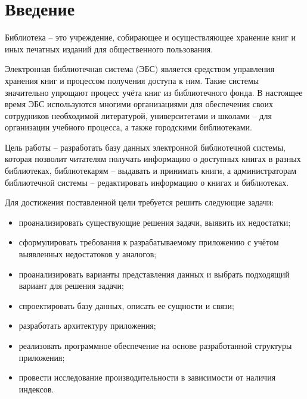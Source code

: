 \chapter*{Введение}

Библиотека -- это учреждение, собирающее и осуществляющее хранение книг и иных печатных изданий для общественного пользования. 


Электронная библиотечная система (ЭБС) является средством управления хранения книг и процессом получения доступа к ним. Такие системы значительно упрощают процесс учёта книг из библиотечного фонда. В настоящее время ЭБС используются многими организациями для обеспечения своих сотрудников необходимой литературой, университетами и школами -- для организации учебного процесса, а также городскими библиотеками. 

Цель работы -- разработать базу данных электронной библиотечной системы, которая позволит читателям получать информацию о доступных книгах в разных библиотеках, библиотекарям -- выдавать и принимать книги, а администраторам библиотечной системы -- редактировать информацию о книгах и библиотеках.

Для достижения поставленной цели требуется решить следующие задачи:

\begin{itemize}
    \item проанализировать существующие решения задачи, выявить их недостатки;
    \item сформулировать требования к разрабатываемому приложению с учётом выявленных недостатоков у аналогов;
    \item проанализировать варианты представления данных и выбрать подходящий вариант для решения задачи;
    \item спроектировать базу данных, описать ее сущности и связи;
    \item разработать архитектуру приложения;
    \item реализовать программное обеспечение на основе разработанной структуры приложения;
    \item провести исследование производительности в зависимости от наличия индексов.
\end{itemize}
